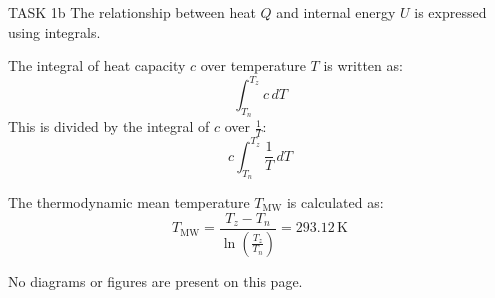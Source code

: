 TASK 1b  
The relationship between heat \( Q \) and internal energy \( U \) is expressed using integrals.  

The integral of heat capacity \( c \) over temperature \( T \) is written as:  
\[
\int_{T_n}^{T_z} c \, dT
\]  
This is divided by the integral of \( c \) over \( \frac{1}{T} \):  
\[
c \int_{T_n}^{T_z} \frac{1}{T} \, dT
\]  

The thermodynamic mean temperature \( T_{\text{MW}} \) is calculated as:  
\[
T_{\text{MW}} = \frac{T_z - T_n}{\ln\left(\frac{T_z}{T_n}\right)} = 293.12 \, \text{K}
\]  

No diagrams or figures are present on this page.